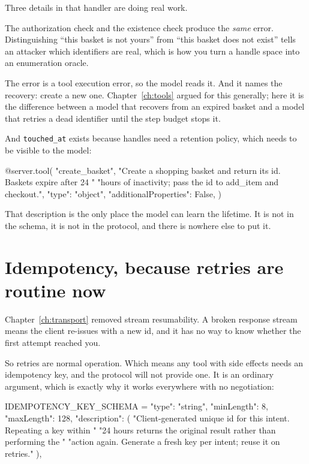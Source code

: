 Three details in that handler are doing real work.

The authorization check and the existence check produce the \emph{same} error.
Distinguishing ``this basket is not yours'' from ``this basket does not exist''
tells an attacker which identifiers are real, which is how you turn a handle
space into an enumeration oracle.

The error is a tool execution error, so the model reads it. And it names the
recovery: create a new one. Chapter~\ref{ch:tools} argued for this generally;
here it is the difference between a model that recovers from an expired basket
and a model that retries a dead identifier until the step budget stops it.

And \texttt{touched\_at} exists because handles need a retention policy, which
needs to be visible to the model:

\begin{py}
@server.tool(
    "create_basket",
    "Create a shopping basket and return its id. Baskets expire after 24 "
    "hours of inactivity; pass the id to add_item and checkout.",
    {"type": "object", "additionalProperties": False},
)
\end{py}

That description is the only place the model can learn the lifetime. It is not
in the schema, it is not in the protocol, and there is nowhere else to put it.

\section{Idempotency, because retries are routine now}

Chapter~\ref{ch:transport} removed stream resumability. A broken response stream
means the client re-issues with a new id, and it has no way to know whether the
first attempt reached you.

So retries are normal operation. Which means any tool with side effects needs an
idempotency key, and the protocol will not provide one. It is an ordinary
argument, which is exactly why it works everywhere with no negotiation:

\begin{py}
IDEMPOTENCY_KEY_SCHEMA = {
    "type": "string",
    "minLength": 8,
    "maxLength": 128,
    "description": (
        "Client-generated unique id for this intent. Repeating a key within "
        "24 hours returns the original result rather than performing the "
        "action again. Generate a fresh key per intent; reuse it on retries."
    ),
}
\end{py}

